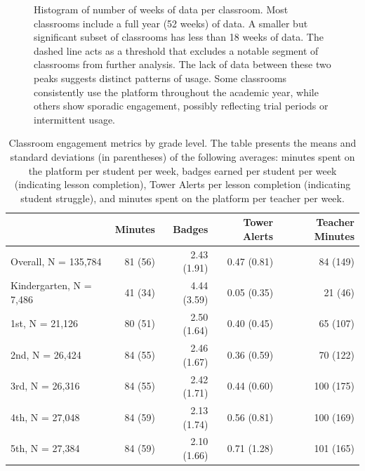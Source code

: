 \documentclass[
  number,
  preprint,
  3p,
  onecolumn]{elsarticle}
\begin{document}
\begin{figure}


\caption{\label{fig-classroom-weeks}Histogram of number of weeks of data
per classroom. Most classrooms include a full year (52 weeks) of data. A
smaller but significant subset of classrooms has less than 18 weeks of
data. The dashed line acts as a threshold that excludes a notable
segment of classrooms from further analysis. The lack of data between
these two peaks suggests distinct patterns of usage. Some classrooms
consistently use the platform throughout the academic year, while others
show sporadic engagement, possibly reflecting trial periods or
intermittent usage.}

\end{figure}%

\begin{longtable}{l|rrrr}

\caption{\label{tbl-classroom-summary}Classroom engagement metrics by
grade level. The table presents the means and standard deviations (in
parentheses) of the following averages: minutes spent on the platform
per student per week, badges earned per student per week (indicating
lesson completion), Tower Alerts per lesson completion (indicating
student struggle), and minutes spent on the platform per teacher per
week.}

\tabularnewline

\toprule
\multicolumn{1}{l}{} & Minutes & Badges & Tower Alerts & Teacher Minutes \\ 
\midrule\addlinespace[2.5pt]
Overall, N = 135,784 & 81 (56) & 2.43 (1.91) & 0.47 (0.81) & 84 (149) \\ 
Kindergarten, N = 7,486 & 41 (34) & 4.44 (3.59) & 0.05 (0.35) & 21 (46) \\ 
1st, N = 21,126 & 80 (51) & 2.50 (1.64) & 0.40 (0.45) & 65 (107) \\ 
2nd, N = 26,424 & 84 (55) & 2.46 (1.67) & 0.36 (0.59) & 70 (122) \\ 
3rd, N = 26,316 & 84 (55) & 2.42 (1.71) & 0.44 (0.60) & 100 (175) \\ 
4th, N = 27,048 & 84 (59) & 2.13 (1.74) & 0.56 (0.81) & 100 (169) \\ 
5th, N = 27,384 & 84 (59) & 2.10 (1.66) & 0.71 (1.28) & 101 (165) \\ 
\bottomrule

\end{longtable}
\end{document}
